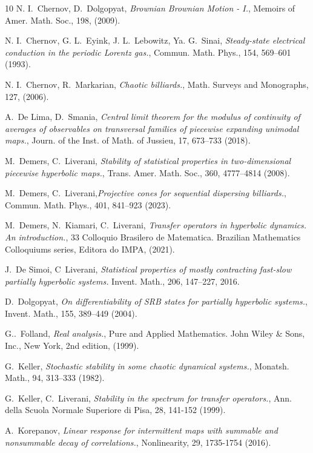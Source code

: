 \documentclass{amsart}
\numberwithin{equation}{section}
\begin{document}
\begin{thebibliography}{10}
N. I.~Chernov, D.~Dolgopyat, \emph{Brownian Brownian Motion - I.}, Memoirs of Amer. Math. Soc., 198, (2009).

N. I.~Chernov, G. L.~Eyink, J. L.~Lebowitz, Ya. G.~Sinai, \emph{Steady-state electrical conduction in the periodic Lorentz gas.}, Commun. Math. Phys., 154, 569--601 (1993).

 N. I.~Chernov, R.~Markarian, \emph{Chaotic billiards.}, Math. Surveys and Monographs, 127, (2006).


 A.~De Lima, D.~Smania, \emph{Central limit theorem for the modulus of continuity of averages of observables on transversal families of piecewise expanding unimodal maps.}, Journ. of the Inst. of Math. of Jussieu, 17, 673--733 (2018).

M.~Demers, C.~Liverani, \emph{Stability of statistical properties in two-dimensional piecewise hyperbolic maps.}, Trans. Amer. Math. Soc., 360, 4777--4814 (2008).

M.~Demers, C.~Liverani,\emph{Projective cones for sequential dispersing billiards.}, Commun. Math.
Phys., 401, 841--923 (2023).

M.~Demers, N.~Kiamari, C.~Liverani, \emph{Transfer operators in hyperbolic dynamics. An introduction.}, 33 Colloquio Brasilero de Matematica. Brazilian Mathematics Colloquiums series, Editora do IMPA, (2021).

J.~De Simoi, C~Liverani, \emph{Statistical properties of mostly contracting fast-slow partially hyperbolic systems.} Invent. Math., 206, 147--227, 2016.


 D.~Dolgopyat, \emph{On differentiability of SRB states for partially hyperbolic systems.}, Invent. Math., 155, 389--449 (2004).

 G..~Folland, \emph{Real analysis.}, Pure and Applied Mathematics. John Wiley \&
Sons, Inc., New York, 2nd edition, (1999).

 G.~Keller, \emph{Stochastic stability in some chaotic dynamical systems.}, Monatsh. Math., 94, 313--333 (1982).

 G.~Keller, C.~Liverani, \emph{Stability in the spectrum for transfer operators.}, Ann. della Scuola Normale Superiore di Pisa, 28, 141-152 (1999).

 A.~Korepanov, \emph{Linear response for intermittent maps with summable and nonsummable decay of correlations.}, Nonlinearity, 29, 1735-1754 (2016).


\end{thebibliography}
\end{document}
